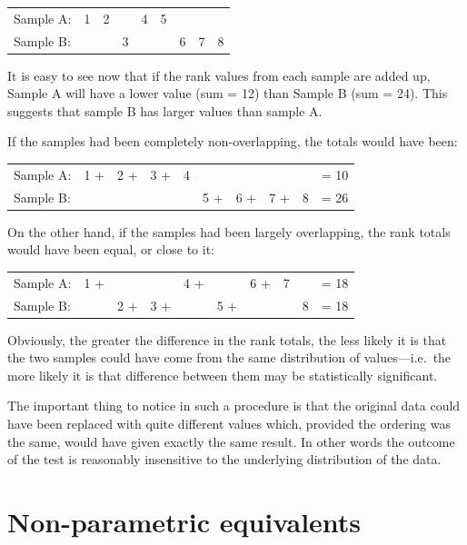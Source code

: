 \documentclass[
]{book}
\begin{document}
\begin{longtable}[]{@{}lcclcclll@{}}
\toprule
& & & & & & & & \\
\midrule
\endhead
Sample A: & 1 & 2 & & 4 & 5 & & & \\
Sample B: & & & 3 & & & 6 & 7 & 8 \\
\bottomrule
\end{longtable}

It is easy to see now that if the rank values from each sample are added up, Sample A will have a lower value (sum = 12) than Sample B (sum = 24). This suggests that sample B has larger values than sample A.

If the samples had been completely non-overlapping, the totals would have been:

\begin{longtable}[]{@{}lcccclllll@{}}
\toprule
& & & & & & & & & \\
\midrule
\endhead
Sample A: & 1 + & 2 + & 3 + & 4 & & & & & = 10 \\
Sample B: & & & & & 5 + & 6 + & 7 + & 8 & = 26 \\
\bottomrule
\end{longtable}

On the other hand, if the samples had been largely overlapping, the rank totals would have been equal, or close to it:

\begin{longtable}[]{@{}lcllclccll@{}}
\toprule
& & & & & & & & & \\
\midrule
\endhead
Sample A: & 1 + & & & 4 + & & 6 + & 7 & & = 18 \\
Sample B: & & 2 + & 3 + & & 5 + & & & 8 & = 18 \\
\bottomrule
\end{longtable}

Obviously, the greater the difference in the rank totals, the less likely it is that the two samples could have come from the same distribution of values---i.e.~the more likely it is that difference between them may be statistically significant.

The important thing to notice in such a procedure is that the original data could have been replaced with quite different values which, provided the ordering was the same, would have given exactly the same result. In other words the outcome of the test is reasonably insensitive to the underlying distribution of the data.

\hypertarget{non-parametric-equivalents}{%
\section{Non-parametric equivalents}\label{non-parametric-equivalents}}
\end{document}
